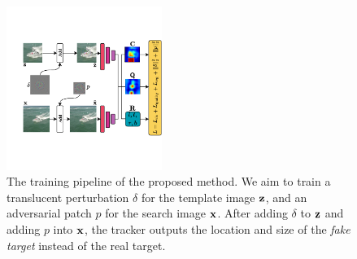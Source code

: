\documentclass[journal]{IEEEtran}
\begin{document}
\begin{figure}[t]
  \centering
  \includegraphics[width=0.45\textwidth]{images_imperceptible/network_v5.pdf}
  \caption{The training pipeline of the proposed method. We aim to train a translucent perturbation $\delta$ for the template image $\textbf z$, and an adversarial patch $p$ for the search image $\textbf x$. After adding $\delta$ to $\textbf z$ and adding $p$ into $\textbf x$, the tracker outputs the location and size of the \textit{fake target} instead of the real target.}
  \label{fig:net}
  \vspace{-3mm}
\end{figure}
\end{document}
